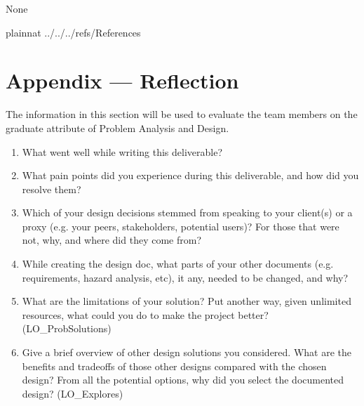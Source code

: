 \documentclass[12pt, titlepage]{article}
\begin{document}

None

\newpage

 {plainnat}
 {../../../refs/References}

\newpage



\newpage{}

\section*{Appendix --- Reflection}

The information in this section will be used to evaluate the team members on the
graduate attribute of Problem Analysis and Design.



\begin{enumerate}
  \item What went well while writing this deliverable? 
  \item What pain points did you experience during this deliverable, and how
    did you resolve them?
  \item Which of your design decisions stemmed from speaking to your client(s)
  or a proxy (e.g. your peers, stakeholders, potential users)? For those that
  were not, why, and where did they come from?
  \item While creating the design doc, what parts of your other documents (e.g.
  requirements, hazard analysis, etc), it any, needed to be changed, and why?
  \item What are the limitations of your solution?  Put another way, given
  unlimited resources, what could you do to make the project better? (LO\_ProbSolutions)
  \item Give a brief overview of other design solutions you considered.  What
  are the benefits and tradeoffs of those other designs compared with the chosen
  design?  From all the potential options, why did you select the documented design?
  (LO\_Explores)
\end{enumerate}
\end{document}
